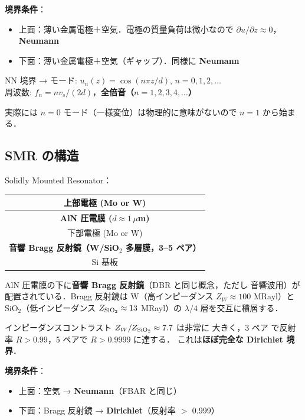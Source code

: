 \documentclass[11pt,a4paper]{article}
\begin{document}
\textbf{境界条件}：
\begin{itemize}
\item 上面：薄い金属電極＋空気．電極の質量負荷は微小なので
$\partial u/\partial z \approx 0$，\textbf{Neumann}
\item 下面：薄い金属電極＋空気（ギャップ）．同様に \textbf{Neumann}
\end{itemize}

NN 境界 → モード: $u_n(z) = \cos(n\pi z/d)$, $n=0,1,2,\ldots$\\
周波数: $f_n = n v_s/(2d)$，\textbf{全倍音（$n=1,2,3,4,\ldots$）}

実際には $n=0$ モード（一様変位）は物理的に意味がないので $n=1$
から始まる．

\subsection{SMR の構造}

Solidly Mounted Resonator：

\begin{center}
\begin{tabular}{|c|}
\hline
上部電極 (Mo or W) \\
\hline
\textbf{AlN 圧電膜 ($d \approx 1\,\mu$m)} \\
\hline
下部電極 (Mo or W) \\
\hline
\textbf{音響 Bragg 反射鏡（W/SiO$_2$ 多層膜，3--5 ペア）}\\
\hline
Si 基板 \\
\hline
\end{tabular}
\end{center}

AlN 圧電膜の下に\textbf{音響 Bragg 反射鏡}（DBR と同じ概念，ただし
音響波用）が配置されている．Bragg 反射鏡は W（高インピーダンス
$Z_W \approx 100$ MRayl）と SiO$_2$（低インピーダンス $Z_{\rm SiO_2}
\approx 13$ MRayl）の $\lambda/4$ 層を交互に積層する．

インピーダンスコントラスト $Z_W/Z_{\rm SiO_2} \approx 7.7$ は非常に
大きく，3 ペア で反射率 $R > 0.99$，5 ペアで $R > 0.9999$ に達する．
これは\textbf{ほぼ完全な Dirichlet 境界}．

\textbf{境界条件}：
\begin{itemize}
\item 上面：空気 → \textbf{Neumann}（FBAR と同じ）
\item 下面：Bragg 反射鏡 → \textbf{Dirichlet}（反射率 $>$ 0.999）
\end{itemize}
\end{document}
